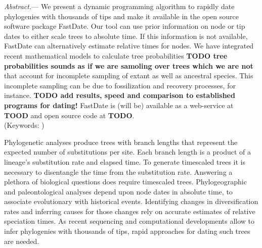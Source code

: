 \documentclass{llncs}
\newcommand{\ejmcomment}[1]{{\color{green} #1}}
\renewcommand{\subsubsection}[1]{%
\vspace{2ex}
\noindent
\textit{#1.}---}
\begin{document}
\subsubsection{Abstract} We present a dynamic programming algorithm to rapidly
date phylogenies with thousands of tips and make it available in the open source software package FastDate. 
Our tool can use prior information on node or tip dates to either scale trees to absolute time.
If this information is not available, FastDate can alternatively estimate relative times for nodes.
We have integrated recent mathematical models to calculate tree probabilities {\bf TODO tree probabilities sounds as if we are samoling over trees which we are not} 
that account for
incomplete  sampling of extant as well as ancestral species.
This incomplete sampling can be due to fossilization and recovery processes, for instance.
{\bf TODO add results, speed and comparison to established programs for dating!}
FastDate is \ejmcomment{(will be)} available as a web-service at {\bf TOOD} and open source code at {\bf TODO}.\\
\noindent (Keywords: )\\

\vspace{1.5in}

Phylogenetic analyses produce trees with branch lengths that represent the expected number of substitutions per site.
Each branch length is a product of a lineage's substitution rate and elapsed time.
To generate time\textendash scaled trees it is necessary to disentangle the time from the substitution rate.
Answering  a plethora of biological questions does require time\textendash scaled trees.
Phylogeographic and paleontological analyses depend upon node dates in absolute time,
to associate evolutionary with historical events.
Identifying changes in diversification rates and inferring causes for those changes
rely on accurate estimates of relative speciation times.
As recent sequencing and computational developments allow to infer
phylogenies with thousands of tips, rapid approaches for dating such trees are needed.
\end{document}
